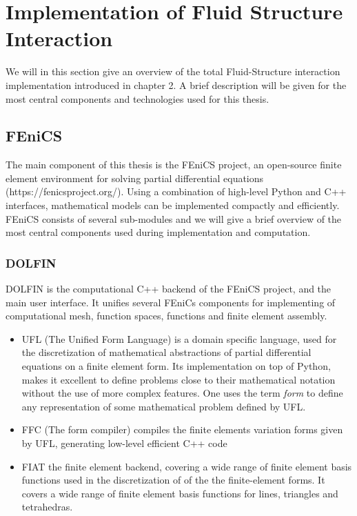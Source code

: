 \chapter{Implementation of Fluid Structure Interaction}

We will in this section give an overview of the total Fluid-Structure interaction implementation introduced in chapter 2. A brief description will be given for the most central components and technologies used for this thesis.  

\section{FEniCS}
The main component of this thesis is the FEniCS project, an open-source finite element environment for solving partial differential equations (https://fenicsproject.org/). Using a combination of high-level Python and C++ interfaces, mathematical models can be implemented compactly and efficiently. FEniCS consists of several sub-modules and we will give a brief overview of the most central components used during implementation and computation.

\subsection{DOLFIN}
DOLFIN is the computational C++ backend of the FEniCS project, and the main user interface. It unifies several FEniCs components for implementing of computational mesh, function spaces, functions and finite element assembly. 

\begin{itemize} 
\item UFL (The Unified Form Language)  is a domain specific language, used for the discretization of mathematical abstractions of partial differential equations on a finite element form. Its implementation on top of Python, makes it excellent to define problems close to their mathematical notation without the use of more complex features. One uses the term \textit{form} to define any representation of some mathematical problem defined by UFL.   

\item FFC (The form compiler) compiles the finite elements variation forms given by UFL, generating low-level efficient C++ code 

\item FIAT the finite element backend, covering a wide range of finite element basis functions used in the discretization of of the  the finite-element forms. It covers a wide range of finite element basis functions for lines, triangles and tetrahedras.

\end{itemize}  


